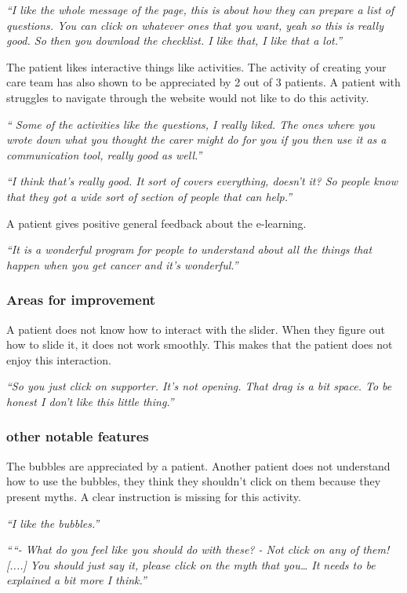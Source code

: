 \documentclass{sigchi}
\begin{document}
\textit{“I like the whole message of the page, this is about how they can prepare a list of questions. You can click on whatever ones that you want, yeah so this is really good. So then you download the checklist. I like that, I like that a lot.”}

The patient likes interactive things like activities. The activity of creating your care team has also shown to be appreciated by 2 out of 3 patients. A patient with struggles to navigate through the website would not like to do this activity.

\textit{“ Some of the activities like the questions, I really liked. The ones where you wrote down what you thought the carer might do for you if you then use it as a communication tool, really good as well.”}

\textit{“I think that’s really good. It sort of covers everything, doesn’t it? So people know that they got a wide sort of section of people that can help.”}

A patient gives positive general feedback about the e-learning.

\textit{“It is a wonderful program for people to understand about all the things that happen when you get cancer and it’s wonderful.”}

\subsubsection{Areas for improvement}
A patient does not know how to interact with the slider. When they figure out how to slide it, it does not work smoothly. This makes that the patient does not enjoy this interaction.

\textit{“So you just click on supporter. It’s not opening. That drag is a bit space. To be honest I don’t like this little thing.”}

\subsubsection{other notable features}
The bubbles are appreciated by a patient. Another patient does not understand how to use the bubbles, they think they shouldn’t click on them because they present myths. A clear instruction is missing for this activity.

\textit{“I like the bubbles.”}

\textit{““- What do you feel like you should do with these? - Not click on any of them! [....] You should just say it, please click on the myth that you… It needs to be explained a bit more I think.”}
\end{document}
